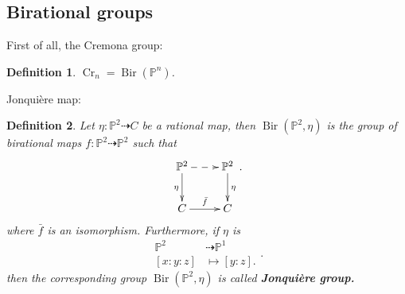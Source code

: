\documentclass{article}
\newtheorem{defn}{Definition}[section]
\begin{document}
\subsection{Birational groups}
First of all, the Cremona group:
\begin{defn}
  $\operatorname{Cr}_n=\operatorname{Bir}(\mathbb{P}^{n})$.
\end{defn}
Jonqui\`{e}re map:
\begin{defn}
  Let $\eta:\mathbb{P}^{2}\dashrightarrow C$ be a rational map, then $\operatorname{Bir}(\mathbb{P}^{2},\eta)$ is the group of birational maps $f:\mathbb{P}^{2}\dashrightarrow \mathbb{P}^{2}$ such that 
  \[
    \xymatrix{
      \mathbb{P}^{2}\ar@{-->}[r]\ar[d]_\eta&\mathbb{P}^{2}\ar[d]^\eta  \\
    C\ar[r]^{\bar{f}}&C \\ }
  .\]
  where $\bar{f}$ is an isomorphism. Furthermore, if $\eta$ is
  \[
    \begin{aligned}
      \mathbb{P}^{2}&\dashrightarrow \mathbb{P}^{1}\\ 
      [x:y:z]&\mapsto [y:z]
    .\end{aligned}
  .\]
  then the corresponding group $\operatorname{Bir}(\mathbb{P}^{2},\eta)$ is called \bf{Jonqui\`{e}re group}.
\end{defn}
\end{document}
